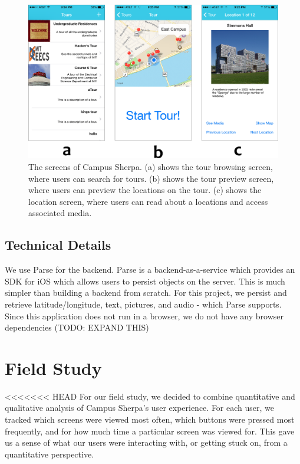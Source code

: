 \documentclass{sigchi}
\begin{document}
\begin{figure}
\centering
\includegraphics[width=1.0\linewidth]{./Figure2}
\caption{The screens of Campus Sherpa. (a) shows the tour browsing screen, where users can search for tours. (b) shows the tour preview screen, where users can preview the locations on the tour. (c) shows the location screen, where users can read about a locations and access associated media.}
\label{fig:Figure2}
\end{figure}


\subsection{Technical Details}
We use Parse for the backend. Parse is a backend-as-a-service which provides an SDK for iOS which allows users to persist objects on the server. This is much simpler than building a backend from scratch. For this project, we persist and retrieve latitude/longitude, text, pictures, and audio - which Parse supports. Since this application does not run in a browser, we do not have any browser dependencies (TODO: EXPAND THIS)
    
\section{Field Study}

<<<<<<< HEAD
For our field study, we decided to combine quantitative and qualitative analysis of Campus Sherpa's user experience. For each user, we tracked which screens were viewed most often, which buttons were pressed most frequently, and for how much time a particular screen was viewed for. This gave us a sense of what our users were interacting with, or getting stuck on, from a quantitative perspective.
\end{document}
